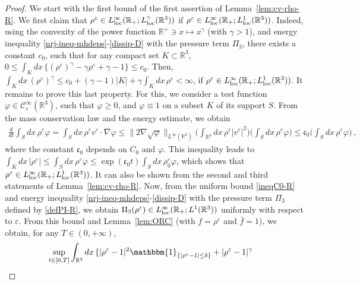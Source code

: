 \documentclass[11pt,reqno]{amsart}
\def \R{{\mathbb{R}}}
\begin{document}
\begin{proof}
  We start with the first bound of the first assertion of Lemma~\ref{lem:cv-rho-R}. We first claim that $\rho^\varepsilon \in L_{\rm loc}^\infty(\R_+; L_{\rm loc}^\gamma(\R^3))$ if  $\rho^\varepsilon \in L_{\rm loc}^\infty(\R_+; L_{\rm loc}^1(\R^3))$. Indeed, using the convexity of the power function $\R^+\ni x\mapsto x^\gamma$ (with $\gamma >1$), and energy inequality \eqref{nrj-ineq-mhdeps}-\eqref{dissip-D} with the pressure term $\Pi_3$, there exists a constant $ c_0$, such that for any compact set $K\subset \R^3$, $0\leq \int_{K}dx \,\{ (\rho^\varepsilon)^\gamma - \gamma \rho^\varepsilon +\gamma -1 \}\leq  c_0$. Then, $ \int_{K}dx \,(\rho^\varepsilon)^\gamma \leq  c_0 + (\gamma-1)|K|+\gamma \int_{K}dx \,\rho^\varepsilon <\infty$, if  $\rho^\varepsilon \in L_{\rm loc}^\infty(\R_+; L_{\rm loc}^1(\R^3))$. It remains to prove this last property. For this, we consider a test function $\varphi \in \mathscr{C}_c^\infty(\R^3)$, such that $\varphi \geq 0$, and $\varphi \equiv 1$ on a subset $ K $ of its support $ S $. From the mass conservation law and the energy estimate, we obtain
\begin{align*}
  \frac{d}{dt} \int_{S} dx \, \rho^\varepsilon  \varphi  =
  \int_S dx\, \rho^\varepsilon v^\varepsilon \cdot \nabla \varphi 
   \leq \| 2 \nabla \sqrt{\varphi}\|_{L^\infty(\R^3)}\bigg(\int_{\R^3}dx\, \rho^\varepsilon |v^\varepsilon|^2\bigg)
  \bigg(\int_{S}dx\, \rho^\varepsilon \varphi \bigg) \leq \mathfrak c_0
  \bigg(\int_{S} dx\,\rho^\varepsilon \varphi\bigg) \,,
\end{align*}
where the constant $\mathfrak c_0$ depends on $C_0$ and $\varphi$. This inequality leads to $ \int_{K} dx\, |\rho^\varepsilon| \leq \int_{S} dx\, \rho^\varepsilon \varphi \leq \exp(\mathfrak c_0 t)\int_{S} dx\, \rho_0^\varepsilon \varphi $, which shows that $\rho^\varepsilon \in L_{\rm loc}^\infty(\R_+; L_{\rm loc}^1(\R^3))$. It can also be shown from the second and third statements of  Lemma~\ref{lem:cv-rho-R}. Now, from the uniform bound \eqref{ineqC0-R} and energy inequality \eqref{nrj-ineq-mhdeps}-\eqref{dissip-D} with the pressure term $\Pi_3$ defined by \eqref{defPI-R}, we obtain $\Pi_3(\rho^\varepsilon) \in L_{\rm loc}^\infty(\R_+;L^1(\R^3))$ uniformly with respect to $\varepsilon$. From this bound and Lemma~\ref{lem:ORC} (with $f=\rho^\varepsilon$ and $\bar f=1$), we obtain, for any $T\in (0,+\infty)$,
\begin{align}
  \label{eqn:bdze}
 &\sup_{t\in[0,T]}  \int_{\R^3}dx \,\{ |\rho^\varepsilon-1|^2
\mathbbm{1}_{\{|\rho^\varepsilon-1|\leq \delta\}} + |\rho^\varepsilon-1|^\gamma

\end{align}
\end{proof}
\end{document}
